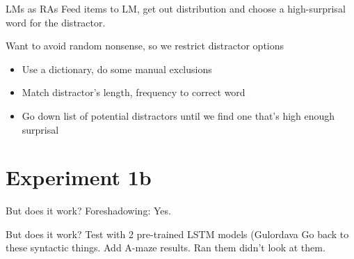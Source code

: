 \documentclass[12pt, xcolor=beamer,table,dvipsnames, ignorenonframetext, ngerman]{beamer}
\begin{document}
\begin{frame}{LMs as RAs}
Feed items to LM, get out distribution and choose a high-surprisal word for the distractor.

Want to avoid random nonsense, so we restrict distractor options
\begin{itemize}
	\item Use a dictionary, do some manual exclusions
	\item Match distractor's length, frequency to correct word
	\item Go down list of potential distractors until we find one that's high enough surprisal
\end{itemize}

\end{frame}

\section{Experiment 1b}
\begin{frame}{But does it work?}
Foreshadowing: Yes.
\end{frame}

\begin{frame}{But does it work?}
Test with 2 pre-trained LSTM models (Gulordava 
Go back to these syntactic things. Add A-maze results. Ran them didn't look at them. 
\end{frame}
\end{document}

